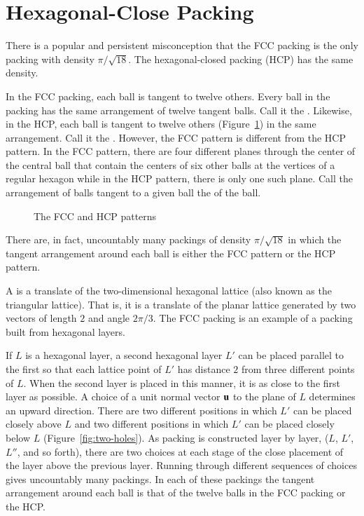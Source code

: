 \section{Hexagonal-Close Packing}

There is a popular and persistent misconception that the FCC
 packing is the only packing with density $\pi/\sqrt{18}$.
The hexagonal-closed packing (HCP) has the same density.
%
%
%
%

In the FCC packing, each ball is tangent to twelve
others.  Every ball in the packing has the same arrangement of twelve
tangent balls.  Call it the .  Likewise, in the
HCP, each ball is tangent to twelve others
(Figure~\ref{fig:hcp}) in the same arrangement.  Call it the
.  However, the FCC pattern is different from the
HCP pattern.  In the FCC pattern, there are four different planes
through the center of the central ball that contain the centers of six
other balls at the vertices of a regular hexagon while in the HCP
pattern, there is only one such plane.  Call the arrangement of balls
tangent to a given ball the  of the
ball.

\begin{figure}[htb]
  \centering
  \caption{The FCC and HCP patterns}
  \label{fig:hcp}
\end{figure}

There are, in fact, uncountably many packings of density $\pi/\sqrt{18}$ in which
the tangent arrangement around each ball is either the FCC
pattern or the HCP pattern.

A  is a translate of the
two-dimensional hexagonal lattice (also known as the triangular
lattice). That is, it is a translate of the planar lattice generated
by two vectors of length $2$ and angle $2\pi/3$.  The FCC
 packing is an example of a packing built from hexagonal layers.

 If $L$ is a hexagonal layer, a second hexagonal layer $L'$ can be
 placed parallel to the first so that each lattice point of $L'$ has
 distance $2$ from three different points of $L$.  When the second
 layer is placed in this manner, it is as close to the first layer as
 possible.  A choice of a unit normal vector ${\mathbf u}$ to the plane of $L$ determines
 an upward direction.  There are two different positions in which $L'$
 can be placed closely above $L$ and two different positions in which
 $L'$ can be placed closely below $L$ (Figure~\ref{fig:two-holes}). As
 packing is constructed layer by layer, ($L$, $L'$, $L''$, and so
 forth), there are two choices at each stage of the close placement of
 the layer above the previous layer. Running through different
 sequences of choices gives uncountably many packings.  In each of
 these packings the tangent arrangement around each ball is that of
 the twelve balls in the FCC packing or the HCP.

